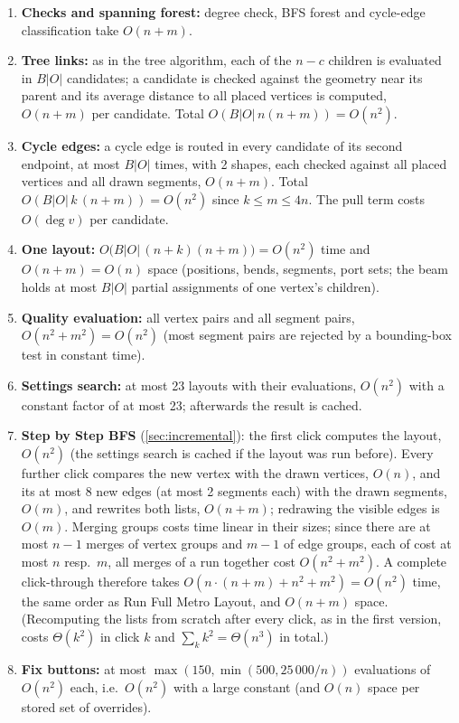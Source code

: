 \documentclass[11pt,a4paper]{article}
\begin{document}
\begin{enumerate}
  \item \textbf{Checks and spanning forest:} degree check, BFS forest and cycle-edge classification take $O(n+m)$.
  \item \textbf{Tree links:} as in the tree algorithm, each of the $n-c$ children is evaluated in $B|O|$ candidates; a candidate is checked against the geometry near its parent and its average distance to all placed vertices is computed, $O(n+m)$ per candidate. Total $O(B|O|\,n(n+m))=O(n^2)$.
  \item \textbf{Cycle edges:} a cycle edge is routed in every candidate of its second endpoint, at most $B|O|$ times, with 2 shapes, each checked against all placed vertices and all drawn segments, $O(n+m)$. Total $O(B|O|\,k\,(n+m))=O(n^2)$ since $k\le m\le 4n$. The pull term costs $O(\deg v)$ per candidate.
  \item \textbf{One layout:} $O\bigl(B|O|\,(n+k)(n+m)\bigr)=O(n^2)$ time and $O(n+m)=O(n)$ space (positions, bends, segments, port sets; the beam holds at most $B|O|$ partial assignments of one vertex's children).
  \item \textbf{Quality evaluation:} all vertex pairs and all segment pairs, $O(n^2+m^2)=O(n^2)$ (most segment pairs are rejected by a bounding-box test in constant time).
  \item \textbf{Settings search:} at most 23 layouts with their evaluations, $O(n^2)$ with a constant factor of at most 23; afterwards the result is cached.
  \item \textbf{Step by Step BFS} (\cref{sec:incremental}): the first click computes the layout, $O(n^2)$ (the settings search is cached if the layout was run before). Every further click compares the new vertex with the drawn vertices, $O(n)$, and its at most 8 new edges (at most 2 segments each) with the drawn segments, $O(m)$, and rewrites both lists, $O(n+m)$; redrawing the visible edges is $O(m)$. Merging groups costs time linear in their sizes; since there are at most $n-1$ merges of vertex groups and $m-1$ of edge groups, each of cost at most $n$ resp.\ $m$, all merges of a run together cost $O(n^2+m^2)$. A complete click-through therefore takes $O(n\cdot(n+m)+n^2+m^2)=O(n^2)$ time, the same order as Run Full Metro Layout, and $O(n+m)$ space. (Recomputing the lists from scratch after every click, as in the first version, costs $\Theta(k^2)$ in click $k$ and $\sum_k k^2=\Theta(n^3)$ in total.)
  \item \textbf{Fix buttons:} at most $\max(150,\min(500,25\,000/n))$ evaluations of $O(n^2)$ each, i.e.\ $O(n^2)$ with a large constant (and $O(n)$ space per stored set of overrides).
\end{enumerate}
\end{document}
